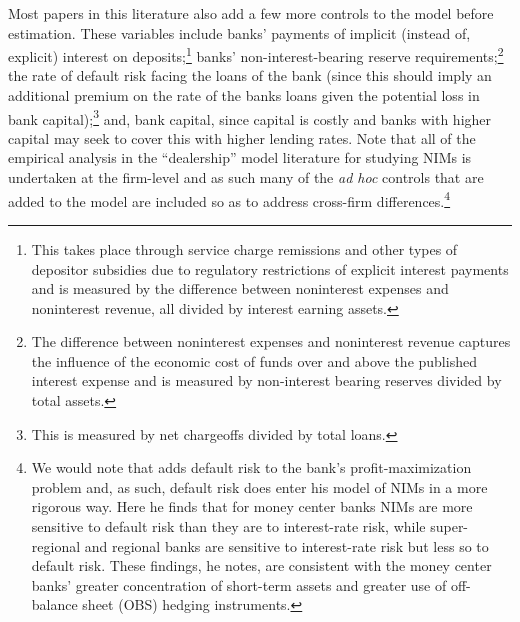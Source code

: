 \documentclass[11pt]{article}
\renewcommand{\baselinestretch}{1.5}
\begin{document}
Most papers in this literature also add a few more controls to the model before estimation.  These variables include banks' payments of implicit (instead of, explicit) interest on deposits;\renewcommand{\baselinestretch}{1}\footnote{This takes place through service charge remissions and other types of depositor subsidies due to regulatory restrictions of explicit interest payments and is measured by the difference between noninterest expenses and noninterest revenue, all divided by interest earning assets.\vspace{0.05in}}\renewcommand{\baselinestretch}{1.5} banks' non-interest-bearing reserve requirements;\renewcommand{\baselinestretch}{1}\footnote{The difference between noninterest expenses and noninterest revenue captures the influence of the economic cost of funds over and above the published interest expense and is measured by non-interest bearing reserves divided by total assets.\vspace{0.05in}}\renewcommand{\baselinestretch}{1.5} the rate of default risk facing the loans of the bank (since this should imply an additional premium on the rate of the banks loans given the potential loss in bank capital);\renewcommand{\baselinestretch}{1}\footnote{This is measured by net chargeoffs divided by total loans.\vspace{0.05in}}\renewcommand{\baselinestretch}{1.5} and, bank capital, since capital is costly and banks with higher capital may seek to cover this with higher lending rates.  Note that all of the empirical analysis in the ``dealership'' model literature for studying NIMs is undertaken at the firm-level and as such many of the \textit{ad hoc} controls that are added to the model are included so as to address cross-firm differences.\renewcommand{\baselinestretch}{1}\footnote{We would note that  adds default risk to the bank's profit-maximization problem and, as such, default risk does enter his model of NIMs in a more rigorous way.  Here he finds that for money center banks NIMs are more sensitive to default risk than they are to interest-rate risk, while super-regional and regional banks are sensitive to interest-rate risk but less so to default risk. These findings, he notes, are consistent with the money center banks' greater concentration of short-term assets and greater use of off-balance sheet (OBS) hedging instruments.\vspace{0.05in}}\renewcommand{\baselinestretch}{1.5}
\end{document}
